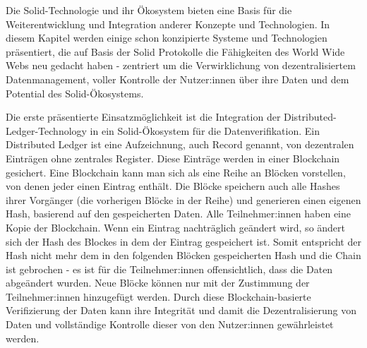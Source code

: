 \documentclass[acmtog]{acmart}
\begin{document}


Die Solid-Technologie und ihr Ökosystem bieten eine Basis für die Weiterentwicklung und Integration anderer Konzepte und Technologien. In diesem Kapitel werden einige schon konzipierte Systeme und Technologien präsentiert, die auf Basis der Solid Protokolle die Fähigkeiten des World Wide Webs neu gedacht haben - zentriert um die Verwirklichung von dezentralisiertem Datenmanagement, voller Kontrolle der Nutzer:innen über ihre Daten und dem Potential des Solid-Ökosystems.

Die erste präsentierte Einsatzmöglichkeit ist die Integration der Distributed-Ledger-Technology in ein Solid-Ökosystem für die Datenverifikation.
Ein Distributed Ledger ist eine Aufzeichnung, auch Record genannt, von dezentralen Einträgen ohne zentrales Register. Diese Einträge werden in einer Blockchain gesichert. Eine Blockchain kann man sich als eine Reihe an Blöcken vorstellen, von denen jeder einen Eintrag enthält. Die Blöcke speichern auch alle Hashes ihrer Vorgänger (die vorherigen Blöcke in der Reihe) und generieren einen eigenen Hash, basierend auf den gespeicherten Daten. Alle Teilnehmer:innen haben eine Kopie der Blockchain. Wenn ein Eintrag nachträglich geändert wird, so ändert sich der Hash des Blockes in dem der Eintrag gespeichert ist. Somit entspricht der Hash nicht mehr dem in den folgenden Blöcken gespeicherten Hash und die Chain ist gebrochen - es ist für die Teilnehmer:innen offensichtlich, dass die Daten abgeändert wurden. Neue Blöcke können nur mit der Zustimmung der Teilnehmer:innen hinzugefügt werden.
Durch diese Blockchain-basierte Verifizierung der Daten kann ihre Integrität und damit die Dezentralisierung von Daten und vollständige Kontrolle dieser von den Nutzer:innen gewährleistet werden. ~\cite{ramachandran2020towards}
\end{document}
